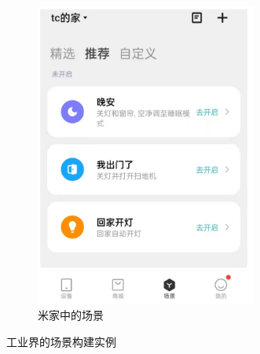 \documentclass[winfonts,master,twoside]{njuthesis}
\begin{document}
\begin{figure}[H]
\begin{subfigure}{.5\textwidth}
		\includegraphics[width=0.8\textwidth]{figure/2-relatework/mihome-context.png}
		\caption{米家中的场景}
		\label{subfig:b}
	\end{subfigure}
\caption{工业界的场景构建实例}
\label{fig:sub}
\end{figure}
\end{document}
